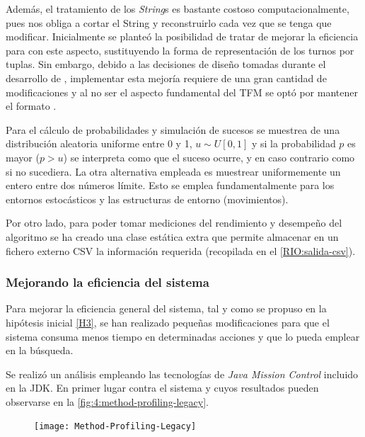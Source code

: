 Además, el tratamiento de los \textit{String}s es bastante costoso computacionalmente, pues nos obliga a cortar el String y reconstruirlo cada vez que se tenga que modificar. Inicialmente se planteó la posibilidad de tratar de mejorar la eficiencia para con este aspecto, sustituyendo la forma de representación de los turnos por tuplas. Sin embargo, debido a las decisiones de diseño tomadas durante el desarrollo de \legacy{}, implementar esta mejoría requiere de una gran cantidad de modificaciones y al no ser el aspecto fundamental del TFM se optó por mantener el formato \legacy{}.

Para el cálculo de probabilidades y simulación de sucesos se muestrea de una distribución aleatoria uniforme entre 0 y 1, $u \sim U[0,1]$ y si la probabilidad $p$ es mayor ($p>u$) se interpreta como que el suceso ocurre, y en caso contrario como si no sucediera. 
La otra alternativa empleada es muestrear uniformemente un entero entre dos números límite. 
Esto se emplea fundamentalmente para los entornos estocásticos y las estructuras de entorno (movimientos).

Por otro lado, para poder tomar mediciones del rendimiento y desempeño del algoritmo se ha creado una clase estática extra que permite almacenar en un fichero externo CSV la información requerida (recopilada en el \ref{RIO:salida-csv}).

\subsubsection{Mejorando la eficiencia del sistema}
\label{sec:4:mejorando-eficiencia}

Para mejorar la eficiencia general del sistema, tal y como se propuso en la hipótesis inicial \ref{H3}, se han realizado pequeñas modificaciones para que el sistema consuma menos tiempo en determinadas acciones y que lo pueda emplear en la búsqueda.

Se realizó un análisis empleando las tecnologías de \textit{Java Mission Control} incluido en la JDK. En primer lugar contra el sistema \legacy{} y cuyos resultados pueden observarse en la \autoref{fig:4:method-profiling-legacy}.

\begin{figure}
	\centering
	\texttt{[image: Method-Profiling-Legacy]}
	\caption{}
	\label{fig:4:method-profiling-legacy}
\end{figure}

